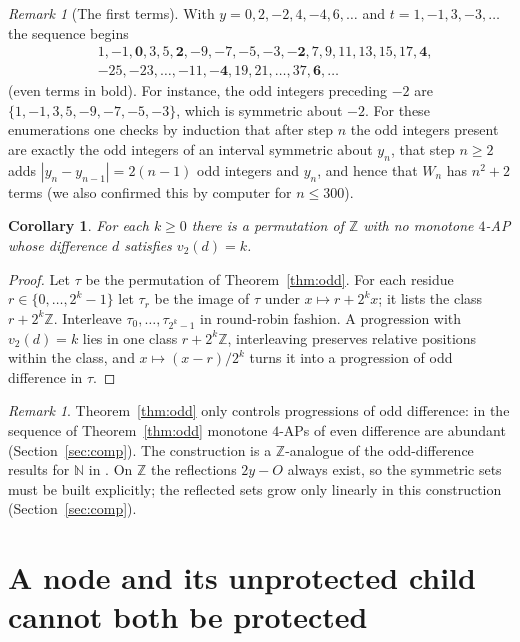 \documentclass[11pt]{amsart}
\newtheorem{corollary}[theorem]{Corollary}
\theoremstyle{definition}
\theoremstyle{remark}
\newtheorem{remark}[theorem]{Remark}
\newcommand{\Z}{\mathbb{Z}}
\newcommand{\N}{\mathbb{N}}
\begin{document}
\begin{remark}[The first terms]
With $y=0,2,-2,4,-4,6,\dots$ and $t=1,-1,3,-3,\dots$ the sequence begins
\[
\begin{aligned}
&1,-1,\mathbf{0},3,5,\mathbf{2},-9,-7,-5,-3,\mathbf{-2},7,9,11,13,15,17,\mathbf{4},\\
&-25,-23,\dots,-11,\mathbf{-4},19,21,\dots,37,\mathbf{6},\dots
\end{aligned}
\]
(even terms in bold). For instance, the odd integers preceding $-2$ are $\{1,-1,3,5,-9,-7,-5,-3\}$, which is symmetric about $-2$. For these enumerations one checks by induction that after step $n$ the odd integers present are exactly the odd integers of an interval symmetric about $y_n$, that step $n\ge2$ adds $|y_n-y_{n-1}|=2(n-1)$ odd integers and $y_n$, and hence that $W_n$ has $n^2+2$ terms (we also confirmed this by computer for $n\le300$).
\end{remark}

\begin{corollary}\label{cor:level}
For each $k\ge0$ there is a permutation of $\Z$ with no monotone $4$-AP whose difference $d$ satisfies $v_2(d)=k$.
\end{corollary}

\begin{proof}
Let $\tau$ be the permutation of Theorem~\ref{thm:odd}. For each residue $r\in\{0,\dots,2^k-1\}$ let $\tau_r$ be the image of $\tau$ under $x\mapsto r+2^kx$; it lists the class $r+2^k\Z$. Interleave $\tau_0,\dots,\tau_{2^k-1}$ in round-robin fashion. A progression with $v_2(d)=k$ lies in one class $r+2^k\Z$, interleaving preserves relative positions within the class, and $x\mapsto(x-r)/2^k$ turns it into a progression of odd difference in $\tau$.
\end{proof}

\begin{remark}
Theorem~\ref{thm:odd} only controls progressions of odd difference: in the sequence of Theorem~\ref{thm:odd} monotone $4$-APs of even difference are abundant (Section~\ref{sec:comp}). The construction is a $\Z$-analogue of the odd-difference results for $\N$ in \cite{LV11,Ad23}. On $\Z$ the reflections $2y-O$ always exist, so the symmetric sets must be built explicitly; the reflected sets grow only linearly in this construction (Section~\ref{sec:comp}).
\end{remark}

\section{A node and its unprotected child cannot both be protected}\label{sec:twolevel}
\end{document}
